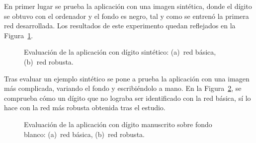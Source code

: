 En primer lugar se prueba la aplicación con una imagen sintética, donde el dígito se obtuvo con el ordenador y el fondo es negro, tal y como se entrenó la primera red desarrollada. Los resultados de este experimento quedan reflejados en la Figura~\ref{fig.experimento1}.

\begin{figure}[H]
	\centering
	 \hspace{5pt}
	\caption{Evaluación de la aplicación con dígito sintético: (a)~red básica, (b)~red robusta.}
	\label{fig.experimento1}
\end{figure}

Tras evaluar un ejemplo sintético se pone a prueba la aplicación con una imagen más complicada, variando el fondo y escribiéndolo a mano. En la Figura~\ref{fig.experimento}, se comprueba cómo un dígito que no lograba ser identificado con la red básica, sí lo hace con la red más robusta obtenida tras el estudio. 

\begin{figure}[H]
	\centering
	 \hspace{5pt}
	\caption{Evaluación de la aplicación con dígito manuscrito sobre fondo blanco: (a)~red básica, (b)~red robusta.}
	\label{fig.experimento}
\end{figure}
\vspace{20pt}

